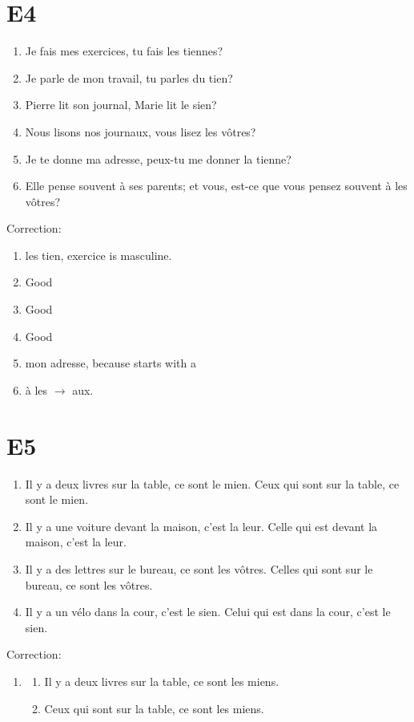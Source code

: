 \documentclass{book}
\begin{document}
    \section{E4}
        \begin{enumerate}
            \item Je fais mes exercices, tu fais les tiennes?
            \item Je parle de mon travail, tu parles du tien?
            \item Pierre lit son journal, Marie lit le sien?
            \item Nous lisons nos journaux, vous lisez les vôtres?
            \item Je te donne ma adresse, peux-tu me donner la tienne?
            \item Elle pense souvent à ses parents; et vous, est-ce que vous pensez souvent à les vôtres?
        \end{enumerate}
        Correction:
        \begin{enumerate}
            \item les tien, exercice is masculine.
            \item Good
            \item Good
            \item Good
            \item mon adresse, because starts with a 
            \item à les $\to$ aux.
        \end{enumerate}

    \section{E5}
        \begin{enumerate}
            \item Il y a deux livres sur la table, ce sont le mien. Ceux qui sont sur la table, ce sont le mien.
            \item Il y a une voiture devant la maison, c'est la leur. Celle qui est devant la maison, c'est la leur.
            \item Il y a des lettres sur le bureau, ce sont les vôtres. Celles qui sont sur le bureau, ce sont les vôtres.
            \item Il y a un vélo dans la cour, c'est le sien. Celui qui est dans la cour, c'est le sien.
        \end{enumerate}
        Correction:
        \begin{enumerate}
            \item 
            \begin{enumerate}
                \item Il y a deux livres sur la table, ce sont les miens.
                \item Ceux qui sont sur la table, ce sont les miens.
            \end{enumerate}
        \end{enumerate}
\end{document}
